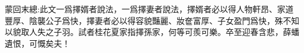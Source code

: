 \begin{parag}
    \begin{note}蒙回末總:此文一爲擇婿者說法，一爲擇妻者說法，擇婿者必以得人物軒昂、家道豐厚、陰襲公子爲快，擇妻者必以得容貌豔麗、妝奩富厚、子女盈門爲快，殊不知以貌取人失之子羽。試者桂花夏家指擇孫家，何等可羨可樂。卒至迎春含悲，薛蟠遺恨，可慨矣夫！\end{note}
\end{parag}
